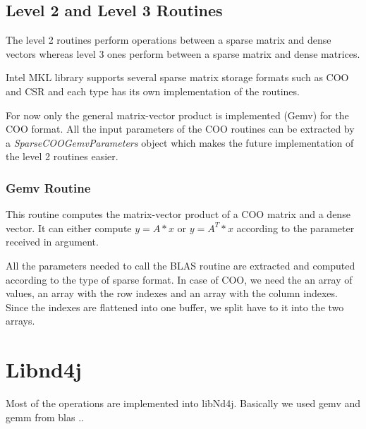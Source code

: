 \subsection{Level 2 and Level 3 Routines}

The level 2 routines perform operations between a sparse matrix and dense vectors whereas level 3 ones perform between a sparse matrix and dense matrices.

Intel MKL library supports several  sparse matrix storage formats such as COO and CSR and each type has its own implementation of the routines.

For now only the general matrix-vector product is implemented (Gemv) for the COO format. All the input parameters of the COO routines can be extracted by a \textit{SparseCOOGemvParameters} object which makes the future implementation of the level 2 routines easier.

\subsubsection{Gemv Routine}
This routine computes the matrix-vector product of a COO matrix and a dense vector. It can either compute $y = A*x$ or $y = A^{T}*x$ according to the parameter received in argument.

All the parameters needed to call the BLAS routine are extracted and computed according to the type of sparse format.
In case of COO, we need the an array of values, an array with the row indexes and an array with the column indexes. Since the indexes are flattened into one buffer, we split have to it into the two arrays.

\section{Libnd4j}
Most of the operations are implemented into libNd4j. Basically we used gemv and gemm from blas
..